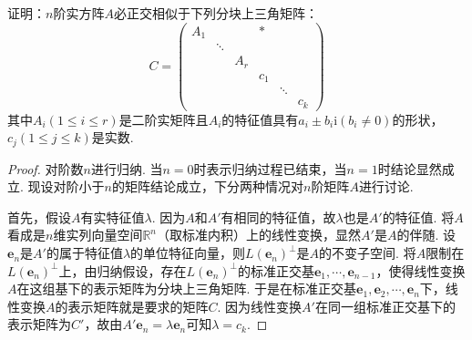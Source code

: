 \documentclass[../../main.tex]{subfiles}
\begin{document}
\begin{proposition}\label{proposition:例9.87}
证明：\(n\)阶实方阵\(A\)必正交相似于下列分块上三角矩阵：
\[
C = 
\begin{pmatrix}
A_1 & & & * \\
& \ddots & & \\
& & A_r & \\
& & & c_1 & \\
& & & & \ddots & \\
& & & & & c_k
\end{pmatrix}
\]
其中\(A_i(1\leqslant  i\leqslant  r)\)是二阶实矩阵且\(A_i\)的特征值具有\(a_i\pm b_i\mathrm{i}(b_i\neq0)\)的形状，\(c_j(1\leqslant  j\leqslant  k)\)是实数.
\end{proposition}
\begin{proof}
对阶数\(n\)进行归纳. 当\(n = 0\)时表示归纳过程已结束，当\(n = 1\)时结论显然成立. 现设对阶小于\(n\)的矩阵结论成立，下分两种情况对\(n\)阶矩阵\(A\)进行讨论.

首先，假设\(A\)有实特征值\(\lambda\). 因为\(A\)和\(A'\)有相同的特征值，故\(\lambda\)也是\(A'\)的特征值. 将\(A\)看成是\(n\)维实列向量空间\(\mathbb{R}^n\)（取标准内积）上的线性变换，显然\(A'\)是\(A\)的伴随. 设\(\boldsymbol{e}_n\)是\(A'\)的属于特征值\(\lambda\)的单位特征向量，则\(L(\boldsymbol{e}_n)^\perp\)是\(A\)的不变子空间. 将\(A\)限制在\(L(\boldsymbol{e}_n)^\perp\)上，由归纳假设，存在\(L(\boldsymbol{e}_n)^\perp\)的标准正交基\(\boldsymbol{e}_1,\cdots,\boldsymbol{e}_{n - 1}\)，使得线性变换\(A\)在这组基下的表示矩阵为分块上三角矩阵. 于是在标准正交基\(\boldsymbol{e}_1,\boldsymbol{e}_2,\cdots,\boldsymbol{e}_n\)下，线性变换\(A\)的表示矩阵就是要求的矩阵\(C\). 因为线性变换\(A'\)在同一组标准正交基下的表示矩阵为\(C'\)，故由\(A'\boldsymbol{e}_n=\lambda\boldsymbol{e}_n\)可知\(\lambda = c_k\).


\end{proof}
\end{document}
